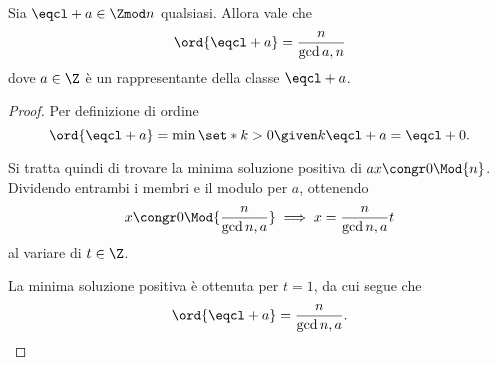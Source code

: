 \begin{proposition}
     \label{prop:ord_in_Z/nZ}
    Sia $\eqcl+ a \in \Zmod n$ qualsiasi. Allora vale che \[
        \ord{\eqcl+ a} = \frac{n}{\gcd{a, n}}    
    \] dove $a \in \Z$ è un rappresentante della classe $\eqcl+ a$.
\end{proposition}
\begin{proof}
    Per definizione di ordine \[
        \ord{\eqcl+ a} = \min \set*{k > 0 \given k \eqcl+ a = \eqcl+ 0}.    
    \]

    Si tratta quindi di trovare la minima soluzione positiva di $ax \congr 0 \Mod{n}$. Dividendo entrambi i membri e il modulo per $a$, ottenendo \[
        x \congr 0 \Mod{\frac{n}{\gcd{n, a}}} \implies x = \frac{n}{\gcd{n, a}}t    
    \] al variare di $t \in \Z$. 

    La minima soluzione positiva è ottenuta per $t = 1$, da cui segue che \[
        \ord{\eqcl+ a} = \frac{n}{\gcd{n, a}}. \qedhere    
    \]
\end{proof}

